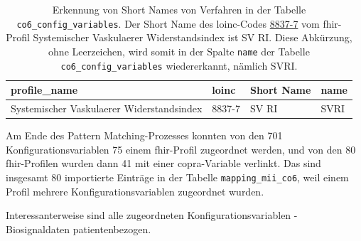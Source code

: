 \begin{table}[ht]
	\centering 
	\caption[Erkennung von \glqq Short Names\grqq{} von Verfahren in der Tabelle \\ co6\_config\_variables]{Erkennung von \glqq Short Names\grqq{} von Verfahren in der Tabelle \texttt{co6\_config\_variables}. Der \glqq Short Name\grqq{} des \ac{loinc}-Codes \href{https://loinc.org/8837-7/}{8837-7} vom \ac{fhir}-Profil \glqq Systemischer Vaskulaerer Widerstandsindex\grqq{} ist \glqq SV RI\grqq{}. Diese Abkürzung, ohne Leerzeichen, wird somit in der Spalte \texttt{name} der Tabelle \texttt{co6\_config\_variables} wiedererkannt, nämlich SVRI.}
	\label{tab:shortnamepattern}
	\begin{tabular}{|p{4cm}|l|l|l|}
		\hline
		\bfseries profile\_name & \bfseries loinc & \bfseries Short Name & \bfseries name \\ \hline
		Systemischer Vaskulaerer Widerstandsindex & 8837-7 & SV RI & SVRI \\ \hline 
	\end{tabular}
\end{table}

Am Ende des Pattern Matching-Prozesses konnten von den 701 Konfigurationsvariablen 75 einem \ac{fhir}-Profil zugeordnet werden, und von den 80 \ac{fhir}-Profilen wurden dann 41 mit einer \ac{copra}-Variable verlinkt. Das sind insgesamt 80 importierte Einträge in der Tabelle \texttt{mapping\_mii\_co6}, weil einem Profil mehrere Konfigurationsvariablen zugeordnet wurden. 

Interessanterweise sind alle zugeordneten Konfigurationsvariablen - Biosignaldaten patientenbezogen. 